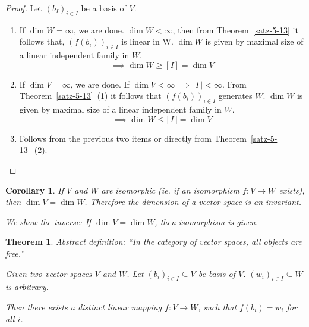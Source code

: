 \documentclass[a4paper,landscape,twocolumn]{article}
\newcommand\card[1]{\left|\,#1\,\right|}
\newtheorem{theorem}{Theorem}[section]
\newtheorem{cor}{Corollary}[section]
\begin{document}
\begin{proof}
  Let $(b_I)_{i \in I}$ be a basis of $V$.
  \begin{enumerate}
    \item
      If $\dim{W} = \infty$, we are done.
      $\dim{W} < \infty$, then from Theorem~\ref{satz-5-13} it follows that,
      $\left(f(b_i)\right)_{i \in I}$ is linear in W.
      $\dim{W}$ is given by maximal size of a linear independent family in $W$.
      \[ \implies \dim{W} \geq [I] = \dim{V} \]
    \item
      If $\dim{V} = \infty$, we are done.
      If $\dim{V} < \infty \implies \card{I} < \infty$.
      From Theorem~\ref{satz-5-13}~(1) it follows that
      $\left(f(b_i)\right)_{i \in I}$ generates $W$.
      $\dim{W}$ is given by maximal size of a linear independent family in $W$.
      \[ \implies \dim{W} \leq \card{I} = \dim{V} \]
    \item
      Follows from the previous two items or directly from Theorem~\ref{satz-5-13}~(2).
  \end{enumerate}
\end{proof}
%
\begin{cor}
  If $V$ and $W$ are isomorphic (ie. if an isomorphism $f: V \rightarrow W$ exists),
  then $\dim{V} = \dim{W}$. Therefore the dimension of a vector space is an invariant.

  We show the inverse: If $\dim{V} = \dim{W}$, then isomorphism is given.
\end{cor}
%
\begin{theorem}
  \label{satz-5-15}
  Abstract definition:
  \enquote{In the category of vector spaces, all objects are free.}

  Given two vector spaces $V$ and $W$. Let $(b_i)_{i \in I} \subseteq V$ be basis of $V$.
  $(w_i)_{i \in I} \subseteq W$ is arbitrary.

  Then there exists a distinct linear mapping $f: V \rightarrow W$, such that $f(b_i) = w_i$ for all $i$.
\end{theorem}
\end{document}
